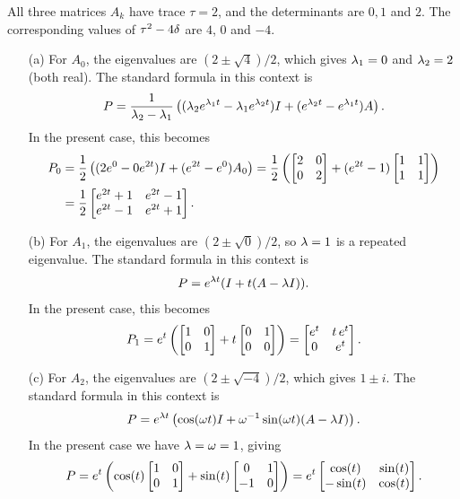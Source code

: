 \documentclass[a4paper]{amsart}
\begin{document}
\begin{solution}
    All three matrices $A_k$ have trace $\tau=2$, and the
   determinants are $0,1$ and $2$.  The corresponding values of
   $\tau^2-4\delta$ are $4$, $0$ and $-4$.  
   \begin{itemize}
    \item[(a)] For $A_0$, the eigenvalues are $(2\pm\sqrt{4})/2$,
     which gives $\lambda_1=0$ and $\lambda_2=2$ (both real).  The standard
     formula in this context is
     \[ P = \frac{1}{\lambda_2-\lambda_1}\left(
             (\lambda_2e^{\lambda_1t}-\lambda_1e^{\lambda_2t})I + 
             (e^{\lambda_2t}-e^{\lambda_1t})A
            \right).
     \]
     In the present case, this becomes
     \begin{align*}
      P_0 &= \frac{1}{2}\left(
             (2e^0-0e^{2t})I + (e^{2t}-e^0)A_0
            \right)
          = \frac{1}{2}\left(
             \left[\begin{matrix} 2 & 0 \\ 0 & 2 \end{matrix}\right] + 
             (e^{2t}-1) \left[\begin{matrix} 1 & 1 \\ 1 & 1 \end{matrix}\right]
            \right) \\
          &= \frac{1}{2}\left[\begin{matrix} e^{2t} + 1 & e^{2t} - 1 \\
                            e^{2t} - 1 & e^{2t} + 1 \end{matrix}\right].
     \end{align*}
    \item[(b)] For $A_1$, the eigenvalues are $(2\pm\sqrt{0})/2$, so
     $\lambda=1$ is a repeated eigenvalue.  The standard formula in this
     context is 
     \[ P = e^{\lambda t}(I + t(A-\lambda I)). \]
     In the present case, this becomes
     \[ P_1 = e^t \left(\left[\begin{matrix} 1 & 0 \\ 0 & 1 \end{matrix}\right] + 
                        t \left[\begin{matrix} 0 & 1 \\ 0 & 0 \end{matrix}\right]\right)
            = \left[\begin{matrix} e^t & t\,e^t \\ 0 & e^t \end{matrix}\right].
     \]
    \item[(c)] For $A_2$, the eigenvalues are $(2\pm\sqrt{-4})/2$,
     which gives $1\pm i$.  The standard formula in this context is 
     \[ P = e^{\lambda t}\left(\cos(\omega t) I +
               \omega^{-1}\sin(\omega t)(A - \lambda I)\right).
     \]
     In the present case we have $\lambda=\omega=1$, giving 
     \[ P = e^t\left(\cos(t)\left[\begin{matrix} 1 & 0 \\ 0 & 1\end{matrix}\right] + 
                     \sin(t)\left[\begin{matrix} 0 & 1 \\ -1 & 0\end{matrix}\right]\right) = 
          e^t \left[\begin{matrix} \cos(t) & \sin(t) \\ -\sin(t) & \cos(t) \end{matrix}\right].
     \]
   \end{itemize}
\end{solution}
\end{document}
